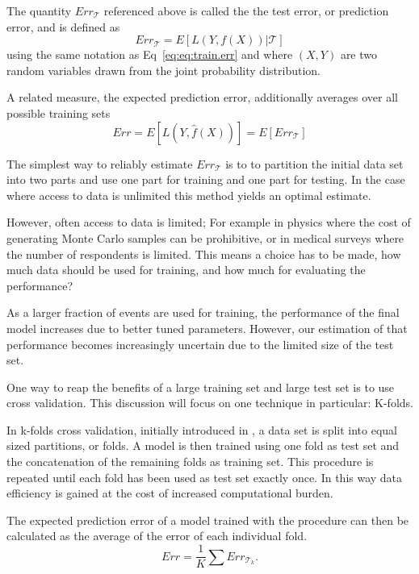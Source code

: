 The quantity $Err_{\mathcal{T}}$ referenced above is called the the test error, or prediction error, and is defined as 
\begin{equation}
Err_{\mathcal{T}} = E\left[L(Y,f(X)) | \mathcal{T} \right]
\end{equation}
using the same notation as Eq~\ref{eq:eq:train.err} and where $(X, Y)$ are two random variables drawn from the joint probability distribution.

A related measure, the expected prediction error, additionally averages over all possible training sets
\begin{equation}
Err = E\left[L(Y, \hat{f}(X))\right] = E\left[Err_{\mathcal{T}}\right]
\end{equation}

The simplest way to reliably estimate $Err_{\mathcal{T}}$ is to to partition the initial data set into two parts and use one part for training and one part for testing. In the case where access to data is unlimited this method yields an optimal estimate.

However, often access to data is limited; For example in physics where the cost of generating Monte Carlo samples can be prohibitive, or in medical surveys where the number of respondents is limited. This means a choice has to be made, how much data should be used for training, and how much for evaluating the performance?

As a larger fraction of events are used for training, the performance of the final model increases due to better tuned parameters. However, our estimation of that performance becomes increasingly uncertain due to the limited size of the test set.

One way to reap the benefits of a large training set and large test set is to use cross validation. This discussion will focus on one technique in particular: K-folds. 

In k-folds cross validation, initially introduced in \cite{k-folds}, a data set is split into equal sized partitions, or folds. A model is then trained using one fold as test set and the concatenation of the remaining folds as training set. This procedure is repeated until each fold has been used as test set exactly once. In this way data efficiency is gained at the cost of increased computational burden.

The expected prediction error of a model trained with the procedure can then be calculated as the average of the error of each individual fold.
\begin{equation}
   Err = \frac{1}{K} \sum Err_{\mathcal{T}_k}.
\end{equation}










